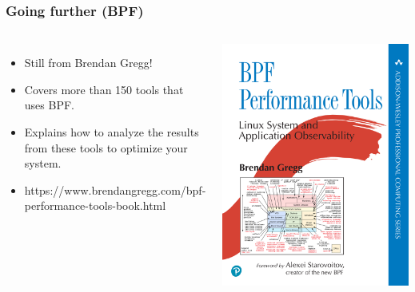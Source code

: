 \begin{frame}[fragile]
  \frametitle{Going further (BPF)}
  \begin{columns}
    \begin{itemize}
    \item Still from Brendan Gregg!
    \item Covers more than 150 tools that uses BPF.
    \item Explains how to analyze the results from these tools to optimize
      your system.
    \item https://www.brendangregg.com/bpf-performance-tools-book.html
    \end{itemize}
    \includegraphics[height=0.6\textheight]{slides/debugging-system-wide-profiling/bpfperftools_bookcover.png}\\ 
  \end{columns}
\end{frame}